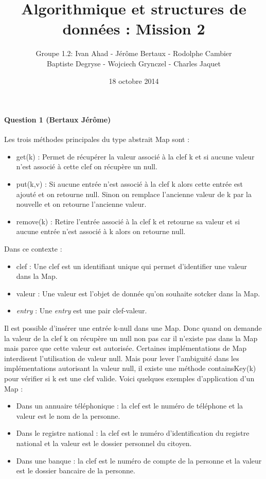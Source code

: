 \documentclass[a4paper]{article}
\title{Algorithmique et structures de données : Mission 2}
\date{18 octobre 2014}
\author{Groupe 1.2: Ivan Ahad - Jérôme Bertaux - Rodolphe Cambier \\ 
	Baptiste Degryse - Wojciech Grynczel - Charles Jaquet}
\begin{document}
\maketitle



\paragraph{Question 1 (Bertaux Jérôme)}
Les trois méthodes principales du type abstrait Map sont :
\begin{itemize}
\item get(k) : Permet de récupérer la valeur associé à la clef k et si aucune valeur n'est associé à cette clef on récupère un null.
\item put(k,v) : Si aucune entrée n'est associé à la clef k alors cette entrée est ajouté et on retourne null. Sinon on remplace l'ancienne valeur de k par la nouvelle et on retourne l'ancienne valeur.
\item remove(k) : Retire l'entrée associé à la clef k et retourne sa valeur et si aucune entrée n'est associé à k alors on retourne null.
\end{itemize}
Dans ce contexte :
\begin{itemize}
\item clef : Une clef est un identifiant unique qui permet d'identifier une valeur dans la Map. 
\item valeur : Une valeur est l'objet de donnée qu'on souhaite sotcker dans la Map.
\item \textit{entry} : Une \textit{entry} est une  pair clef-valeur.
\end{itemize}
Il est possible d'insérer une entrée k-null dans une Map. Donc quand on demande la valeur de la clef k on récupère un null non pas car il n'existe pas dans la Map mais parce que cette valeur est autorisée. Certaines implémentations de Map interdisent l'utilisation de valeur null. Mais pour lever l'ambiguité dans les implémentations autorisant la valeur null, il existe une méthode containsKey(k) pour vérifier si k est une clef valide.
Voici quelques exemples d'application d'un Map :
\begin{itemize}
\item Dans un annuaire téléphonique : la clef est le numéro de téléphone et la valeur est le nom de la personne.
\item Dans le registre national : la clef est le numéro d'identification du registre national et la valeur est le dossier personnel du citoyen.
\item Dans une banque : la clef est le numéro de compte de la personne et la valeur est le dossier bancaire de la personne.
\end{itemize}
\end{document}
